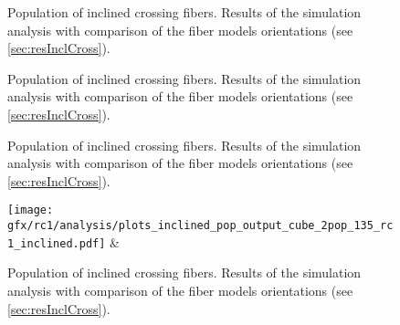 %
\begin{figure}[!p]
\centering
{}
\caption{Population of inclined crossing fibers. Results of the simulation analysis with comparison of the fiber models orientations (see \cref{sec:resInclCross}).}
\label{app:incl_fiber_pop_b}
\end{figure}
%
\begin{figure}[!p]
\centering
{}
\caption{Population of inclined crossing fibers. Results of the simulation analysis with comparison of the fiber models orientations (see \cref{sec:resInclCross}).}
\label{app:incl_fiber_pop_c}
\end{figure}
%
\begin{figure}[!p]
\centering
{}
\caption{Population of inclined crossing fibers. Results of the simulation analysis with comparison of the fiber models orientations (see \cref{sec:resInclCross}).}
\label{app:incl_fiber_pop_d}
\end{figure}
%
\begin{figure}[!p]
\centering
\texttt{[image: gfx/rc1/analysis/plots\_inclined\_pop\_output\_cube\_2pop\_135\_rc1\_inclined.pdf]} &
\caption{Population of inclined crossing fibers. Results of the simulation analysis with comparison of the fiber models orientations (see \cref{sec:resInclCross}).}
\label{app:incl_fiber_pop_e}
\end{figure}